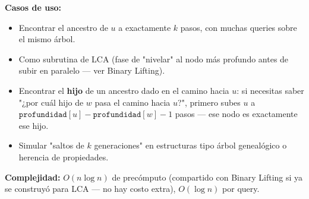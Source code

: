 \documentclass[10pt,a4paper,twocolumn]{article}
\begin{document}
\textbf{Casos de uso:}

\begin{itemize}
    \item Encontrar el ancestro de $u$ a exactamente $k$ pasos, con
    muchas queries sobre el mismo árbol.
    \item Como subrutina de LCA (fase de "nivelar" al nodo más
    profundo antes de subir en paralelo — ver Binary Lifting).
    \item Encontrar el \textbf{hijo} de un ancestro dado en el camino
    hacia $u$: si necesitas saber "¿por cuál hijo de $w$ pasa el
    camino hacia $u$?", primero subes $u$ a
    $\texttt{profundidad}[u] - \texttt{profundidad}[w] - 1$ pasos —
    ese nodo es exactamente ese hijo.
    \item Simular "saltos de $k$ generaciones" en estructuras tipo
    árbol genealógico o herencia de propiedades.
\end{itemize}

\textbf{Complejidad:} $O(n \log n)$ de precómputo (compartido con
Binary Lifting si ya se construyó para LCA — no hay costo extra),
$O(\log n)$ por query.
\end{document}
